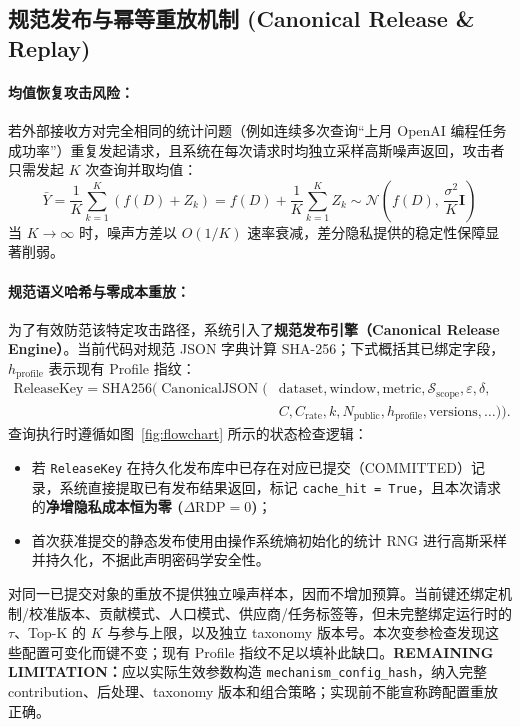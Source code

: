 \subsection{规范发布与幂等重放机制 (Canonical Release \& Replay)}
\paragraph{均值恢复攻击风险：}
若外部接收方对完全相同的统计问题（例如连续多次查询“上月 OpenAI 编程任务成功率”）重复发起请求，且系统在每次请求时均独立采样高斯噪声返回，攻击者只需发起 $K$ 次查询并取均值：
\begin{equation}
  \bar{Y} = \frac{1}{K} \sum_{k=1}^K \left( f(D) + Z_k \right) = f(D) + \frac{1}{K} \sum_{k=1}^K Z_k \sim \mathcal{N}\left(f(D), \, \frac{\sigma^2}{K} \mathbf{I}\right)
\end{equation}
当 $K \to \infty$ 时，噪声方差以 $O(1/K)$ 速率衰减，差分隐私提供的稳定性保障显著削弱。

\paragraph{规范语义哈希与零成本重放：}
为了有效防范该特定攻击路径，系统引入了\textbf{规范发布引擎（Canonical Release Engine）}。当前代码对规范 JSON 字典计算 SHA-256；下式概括其已绑定字段，$h_{\text{profile}}$ 表示现有 Profile 指纹：
\begin{equation}
  \begin{split}
  \text{ReleaseKey}=\text{SHA256}\big(\operatorname{CanonicalJSON}(&\text{dataset},\text{window},\text{metric},\mathcal S_{\text{scope}},\varepsilon,\delta,\\
  &C,C_{\text{rate}},k,N_{\text{public}},h_{\text{profile}},\text{versions},\ldots)\big).
  \end{split}
\end{equation}
查询执行时遵循如图~\ref{fig:flowchart} 所示的状态检查逻辑：
\begin{itemize}[leftmargin=2em]
  \item 若 \texttt{ReleaseKey} 在持久化发布库中已存在对应已提交（COMMITTED）记录，系统直接提取已有发布结果返回，标记 \texttt{cache\_hit = True}，且本次请求的\textbf{净增隐私成本恒为零 ($\Delta\text{RDP} = 0$)}；
  \item 首次获准提交的静态发布使用由操作系统熵初始化的统计 RNG 进行高斯采样并持久化，不据此声明密码学安全性。
\end{itemize}
对同一已提交对象的重放不提供独立噪声样本，因而不增加预算。当前键还绑定机制/校准版本、贡献模式、人口模式、供应商/任务标签等，但未完整绑定运行时的 $\tau$、Top-K 的 $K$ 与参与上限，以及独立 taxonomy 版本号。本次变参检查发现这些配置可变化而键不变；现有 Profile 指纹不足以填补此缺口。\textbf{REMAINING LIMITATION：}应以实际生效参数构造 \texttt{mechanism\_config\_hash}，纳入完整 contribution、后处理、taxonomy 版本和组合策略；实现前不能宣称跨配置重放正确。
